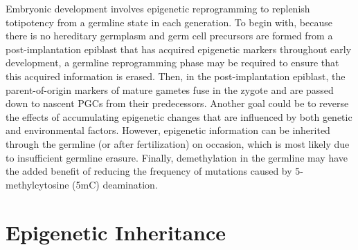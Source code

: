 \documentclass[12pt,twoside]{reedthesis}
\begin{document}
Embryonic development involves epigenetic reprogramming to replenish
totipotency from a germline state in each generation. To begin with,
because there is no hereditary germplasm and germ cell precursors are
formed from a post-implantation epiblast that has acquired epigenetic
markers throughout early development, a germline reprogramming phase may
be required to ensure that this acquired information is erased. Then, in
the post-implantation epiblast, the parent-of-origin markers of mature
gametes fuse in the zygote and are passed down to nascent PGCs from
their predecessors. Another goal could be to reverse the effects of
accumulating epigenetic changes that are influenced by both genetic and
environmental factors. However, epigenetic information can be inherited
through the germline (or after fertilization) on occasion, which is most
likely due to insufficient germline erasure. Finally, demethylation in
the germline may have the added benefit of reducing the frequency of
mutations caused by 5-methylcytosine (5mC) deamination.

\hypertarget{epigenetic-inheritance}{%
\section*{Epigenetic Inheritance}\label{epigenetic-inheritance}}
\end{document}
